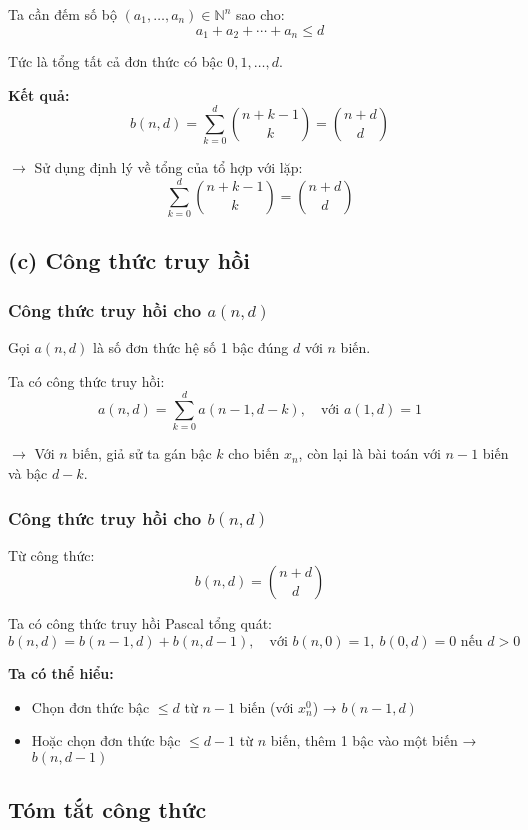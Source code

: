 \documentclass{article}
\begin{document}
	Ta cần đếm số bộ $(a_1, \ldots, a_n) \in \mathbb{N}^n$ sao cho:
	\[
	a_1 + a_2 + \cdots + a_n \le d
	\]
	
	Tức là tổng tất cả đơn thức có bậc $0,1,\ldots,d$.
	
	\textbf{Kết quả:}
	\[
	b(n,d) = \sum_{k=0}^d \binom{n + k - 1}{k} = \binom{n + d}{d}
	\]
	
	$\rightarrow$ Sử dụng định lý về tổng của tổ hợp với lặp:
	\[
	\sum_{k=0}^d \binom{n + k - 1}{k} = \binom{n + d}{d}
	\]
	
	\subsection*{(c) Công thức truy hồi}
	
	\subsubsection*{Công thức truy hồi cho $a(n,d)$}
	
	Gọi $a(n,d)$ là số đơn thức hệ số 1 bậc đúng $d$ với $n$ biến.
	
	Ta có công thức truy hồi:
	\[
	a(n,d) = \sum_{k=0}^{d} a(n - 1, d - k), \quad \text{với } a(1,d) = 1
	\]
	
	$\rightarrow$ Với $n$ biến, giả sử ta gán bậc $k$ cho biến $x_n$, còn lại là bài toán với $n - 1$ biến và bậc $d - k$.
	
	\subsubsection*{Công thức truy hồi cho $b(n,d)$}
	
	Từ công thức:
	\[
	b(n,d) = \binom{n + d}{d}
	\]
	
	Ta có công thức truy hồi Pascal tổng quát:
	\[
	b(n,d) = b(n - 1, d) + b(n, d - 1), \quad \text{với } b(n,0) = 1,\ b(0,d) = 0 \text{ nếu } d > 0
	\]
	
	\textbf{Ta có thể hiểu:} 
	\begin{itemize}
		\item Chọn đơn thức bậc $\le d$ từ $n - 1$ biến (với $x_n^0$) → $b(n - 1, d)$
		\item Hoặc chọn đơn thức bậc $\le d - 1$ từ $n$ biến, thêm 1 bậc vào một biến → $b(n, d - 1)$
	\end{itemize}
	
	\subsection*{Tóm tắt công thức}
	
\end{document}
